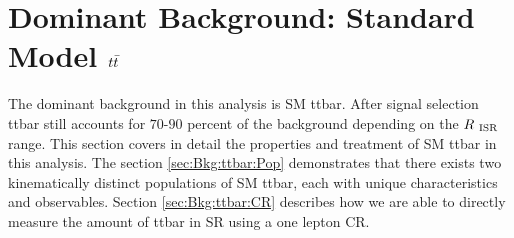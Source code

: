 \section{Dominant Background: Standard Model $t\bar{t}$}
\label{sec:Bkg:ttbar}

\indent The dominant background in this analysis is SM ttbar.  After signal selection ttbar still accounts for $70$-$90$ percent of the background depending on the $R_{~\mathrm{ISR}}$ range.  This section covers in detail the properties and treatment of SM ttbar in this analysis.  The section \ref{sec:Bkg:ttbar:Pop} demonstrates that there exists two kinematically distinct populations of SM ttbar, each with unique characteristics and observables.  Section \ref{sec:Bkg:ttbar:CR} describes how we are able to directly measure the amount of ttbar in SR using a one lepton CR.  \\






